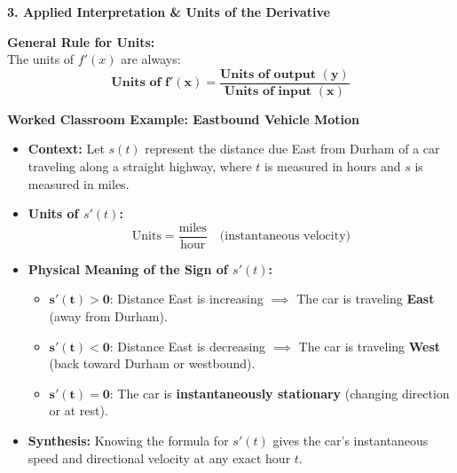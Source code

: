 \documentclass[10.5pt]{article}
\begin{document}
\vspace{0.04in}

\textbf{\large 3. Applied Interpretation \& Units of the Derivative}

\begin{tcolorbox}[colback=chalkblue!6, colframe=chalkblue, boxrule=1pt, arc=3pt, left=8pt, right=8pt, top=4pt, bottom=4pt]
\textbf{General Rule for Units:}\\[1pt]
The units of $f'(x)$ are always:
\[
  \mathbf{\text{Units of } f'(x) = \frac{\text{Units of output } (y)}{\text{Units of input } (x)}}
\]
\end{tcolorbox}

\vspace{0.03in}

\textbf{Worked Classroom Example: Eastbound Vehicle Motion}
\begin{itemize}[leftmargin=1.2em, topsep=1pt, itemsep=3pt]
  \item \textbf{Context:} Let $s(t)$ represent the distance due East from Durham of a car traveling along a straight highway, where $t$ is measured in hours and $s$ is measured in miles.
  \item \textbf{Units of $s'(t)$:}
  \[
    \text{Units} = \frac{\text{miles}}{\text{hour}} \quad \text{(instantaneous velocity)}
  \]
  \item \textbf{Physical Meaning of the Sign of $s'(t)$:}
  \begin{itemize}[label=--]
    \item $\mathbf{s'(t) > 0}$: Distance East is increasing $\implies$ The car is traveling \textbf{East} (away from Durham).
    \item $\mathbf{s'(t) < 0}$: Distance East is decreasing $\implies$ The car is traveling \textbf{West} (back toward Durham or westbound).
    \item $\mathbf{s'(t) = 0}$: The car is \textbf{instantaneously stationary} (changing direction or at rest).
  \end{itemize}
  \item \textbf{Synthesis:} Knowing the formula for $s'(t)$ gives the car's instantaneous speed and directional velocity at any exact hour $t$.
\end{itemize}
\end{document}
